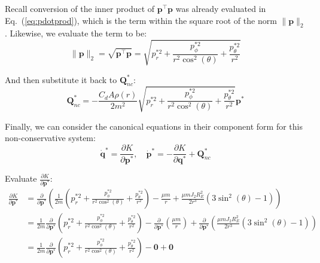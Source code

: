 \documentclass[titlepage]{article}
\begin{document}
Recall conversion of the inner product of $\boldsymbol{p}^\top\boldsymbol{p}$ was already evaluated in Eq.~(\ref{eq:pdotprod}), which is the term within the square root of the norm $\|\boldsymbol{p}\|_2$. Likewise, we evaluate the term to be:
\begin{equation}
	\|\boldsymbol{p}\|_2=\sqrt{\boldsymbol{p}^\top\boldsymbol{p}}=\sqrt{p_r^{*2}+\frac{p_\phi^{*2}}{r^2\cos^2(\theta)}+\frac{p_\theta^{*2}}{r^2}}
\end{equation}

And then substitute it back to $\boldsymbol{Q}_{nc}^*$:
\begin{equation}
	\boldsymbol{Q}_{nc}^*=-\frac{C_dA\rho(r)}{2m^2}\sqrt{p_r^{*2}+\frac{p_\phi^{*2}}{r^2\cos^2(\theta)}+\frac{p_\theta^{*2}}{r^2}}\boldsymbol{p}^*
\end{equation}

Finally, we can consider the canonical equations in their component form for this non-conservative system:
\begin{equation}
	\dot{\boldsymbol{q}}^*=\frac{\partial K}{\partial\boldsymbol{p}^*},\quad\dot{\boldsymbol{p}}^*=-\frac{\partial K}{\partial\boldsymbol{q}^*}+\boldsymbol{Q}_{nc}^*
\end{equation}

Evaluate $\frac{\partial K}{\partial\boldsymbol{p}^*}$:
\begin{equation}
	\begin{split}
		\frac{\partial K}{\partial\boldsymbol{p}^*}&=\frac{\partial}{\partial\boldsymbol{p}^*}\left(\frac{1}{2m}\left(p_r^{*2}+\frac{p_\phi^{*2}}{r^2\cos^2(\theta)}+\frac{p_\theta^{*2}}{r^2}\right)-\frac{\mu m}{r}+\frac{\mu mJ_2R_E^2}{2r^3}\left(3\sin^2(\theta)-1\right)\right) \\
		&=\frac{1}{2m}\frac{\partial}{\partial\boldsymbol{p}^*}\left(p_r^{*2}+\frac{p_\phi^{*2}}{r^2\cos^2(\theta)}+\frac{p_\theta^{*2}}{r^2}\right)-\frac{\partial}{\partial\boldsymbol{p}^*}\left(\frac{\mu m}{r}\right)+\frac{\partial}{\partial\boldsymbol{p}^*}\left(\frac{\mu mJ_2R_E^2}{2r^3}\left(3\sin^2(\theta)-1\right)\right) \\
		&=\frac{1}{2m}\frac{\partial}{\partial\boldsymbol{p}^*}\left(p_r^{*2}+\frac{p_\phi^{*2}}{r^2\cos^2(\theta)}+\frac{p_\theta^{*2}}{r^2}\right)-\boldsymbol{0}+\boldsymbol{0} 
	\end{split}
\end{equation}
	
\end{document}
